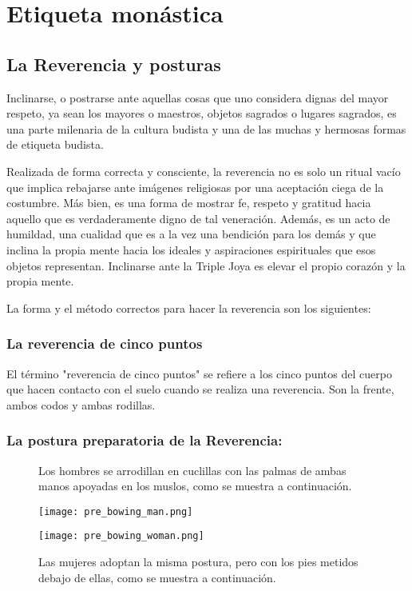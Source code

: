 \chapter{Etiqueta monástica}
\label{etiquette}

\section{La Reverencia y posturas}

Inclinarse, o postrarse ante aquellas cosas que uno considera dignas del mayor respeto, ya sean los mayores o maestros, objetos sagrados o lugares sagrados, es una parte milenaria de la cultura budista y una de las muchas y hermosas formas de etiqueta budista.

Realizada de forma correcta y consciente, la reverencia no es solo un ritual vacío que implica rebajarse ante imágenes religiosas por una aceptación ciega de la costumbre. Más bien, es una forma de mostrar fe, respeto y gratitud hacia aquello que es verdaderamente digno de tal veneración. Además, es un acto de humildad, una cualidad que es a la vez una bendición para los demás y que inclina la propia mente hacia los ideales y aspiraciones espirituales que esos objetos representan. Inclinarse ante la Triple Joya es elevar el propio corazón y la propia mente.

La forma y el método correctos para hacer la reverencia son los siguientes:

\subsection{La reverencia de cinco puntos}

El término "reverencia de cinco puntos" se refiere a los cinco puntos del cuerpo que hacen contacto con el suelo cuando se realiza una reverencia. Son la frente, ambos codos y ambas rodillas.

\captionsetup{font=small, labelformat=empty, position=above}

\subsection{La postura preparatoria de la Reverencia:}

\begin{figure}[h]
	\centering
	
	\begin{minipage}{0.49\textwidth}
		\centering
		\caption{Los hombres se arrodillan en cuclillas con las palmas de ambas manos apoyadas en los muslos, como se muestra a continuación.}
		\texttt{[image: pre\_bowing\_man.png]}
		
	\end{minipage}
	\hfill
	\begin{minipage}{0.49\textwidth}
		\centering
		\caption{Las mujeres adoptan la misma postura, pero con los pies metidos debajo de ellas, como se muestra a continuación.}
		\texttt{[image: pre\_bowing\_woman.png]}
		
	\end{minipage}
	
\end{figure}


